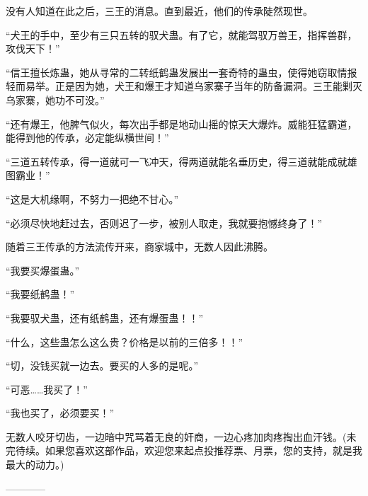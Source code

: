 \begin{this_body}
没有人知道在此之后，三王的消息。直到最近，他们的传承陡然现世。

“犬王的手中，至少有三只五转的驭犬蛊。有了它，就能驾驭万兽王，指挥兽群，攻伐天下！”

“信王擅长炼蛊，她从寻常的二转纸鹤蛊发展出一套奇特的蛊虫，使得她窃取情报轻而易举。正是因为她，犬王和爆王才知道乌家寨子当年的防备漏洞。三王能剿灭乌家寨，她功不可没。”

“还有爆王，他脾气似火，每次出手都是地动山摇的惊天大爆炸。威能狂猛霸道，能得到他的传承，必定能纵横世间！”

“三道五转传承，得一道就可一飞冲天，得两道就能名垂历史，得三道就能成就雄图霸业！”

“这是大机缘啊，不努力一把绝不甘心。”

“必须尽快地赶过去，否则迟了一步，被别人取走，我就要抱憾终身了！”

随着三王传承的方法流传开来，商家城中，无数人因此沸腾。

“我要买爆蛋蛊。”

“我要纸鹤蛊！”

“我要驭犬蛊，还有纸鹤蛊，还有爆蛋蛊！！”

“什么，这些蛊怎么这么贵？价格是以前的三倍多！！”

“切，没钱买就一边去。要买的人多的是呢。”

“可恶……我买了！”

“我也买了，必须要买！”

无数人咬牙切齿，一边暗中咒骂着无良的奸商，一边心疼加肉疼掏出血汗钱。(未完待续。如果您喜欢这部作品，欢迎您来起点投推荐票、月票，您的支持，就是我最大的动力。)

------------

\end{this_body}


